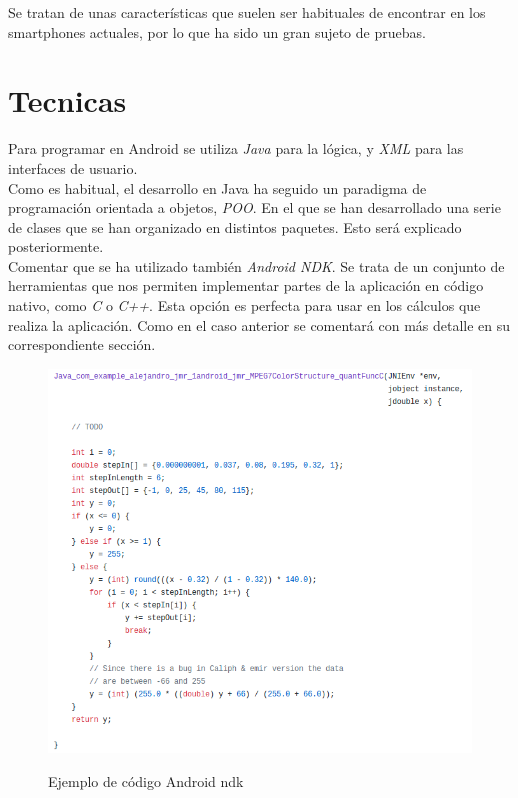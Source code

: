 Se tratan de unas características que suelen ser habituales de encontrar en los smartphones actuales, por lo que ha sido un gran sujeto de pruebas.

\section{Tecnicas}

Para programar en Android se utiliza \textit{Java} para la lógica, y \textit{XML} para las interfaces de usuario.\\

Como es habitual, el desarrollo en Java ha seguido un paradigma de programación orientada a objetos, \textit{POO}. En el que se han desarrollado una serie de clases que se han organizado en distintos paquetes. Esto será explicado posteriormente.\\ 

Comentar que se ha utilizado también \textit{Android NDK}. Se trata de un conjunto de herramientas que nos permiten implementar partes de la aplicación en código nativo, como \textit{C} o \textit{C++}. Esta opción es perfecta para usar en los cálculos que realiza la aplicación. Como en el caso anterior se comentará con más detalle en su correspondiente sección.\\

\begin{figure}[H] %
\centering
\includegraphics[scale=0.6]{imagenes/ndk.png}  %
\label{ndk.png}
\caption{Ejemplo de código Android ndk}
\end{figure}

